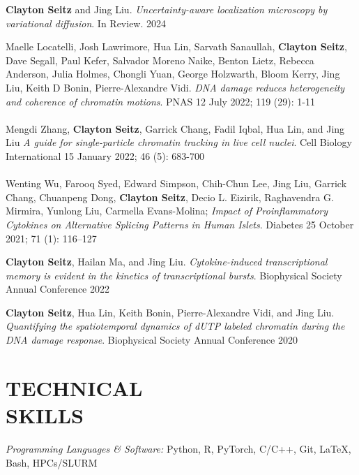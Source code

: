 \documentclass[margin, 10pt]{res} %
\begin{document}
\begin{resume}
\textbf{Clayton Seitz} and Jing Liu. \textit{Uncertainty-aware localization microscopy by variational diffusion}. In Review. 2024

Maelle Locatelli\textsuperscript{\textdagger}, Josh Lawrimore\textsuperscript{\textdagger}, Hua Lin\textsuperscript{\textdagger}, Sarvath Sanaullah, \textbf{Clayton Seitz}, Dave Segall, Paul Kefer, Salvador Moreno Naike, Benton Lietz, Rebecca Anderson, Julia Holmes, Chongli Yuan, George Holzwarth, Bloom Kerry, Jing Liu, Keith D Bonin, Pierre-Alexandre Vidi. \textit{DNA damage reduces heterogeneity and coherence of chromatin motions}. PNAS 12 July 2022; 119 (29): 1-11
\\
\\
Mengdi Zhang, \textbf{Clayton Seitz}, Garrick Chang, Fadil Iqbal, Hua Lin, and Jing Liu \textit{A guide for single-particle chromatin tracking in live cell nuclei}. Cell Biology International 15 January 2022; 46 (5): 683-700
\\
\\
Wenting Wu, Farooq Syed, Edward Simpson, Chih-Chun Lee, Jing Liu, Garrick Chang, Chuanpeng Dong, \textbf{Clayton Seitz}, Decio L. Eizirik, Raghavendra G. Mirmira, Yunlong Liu, Carmella Evans-Molina; \textit{Impact of Proinflammatory Cytokines on Alternative Splicing Patterns in Human Islets}. Diabetes 25 October 2021; 71 (1): 116–127

\textbf{Clayton Seitz}, Hailan Ma, and Jing Liu. \textit{Cytokine-induced transcriptional memory is evident in the kinetics of transcriptional bursts}. Biophysical Society Annual Conference 2022


\textbf{Clayton Seitz}, Hua Lin, Keith Bonin, Pierre-Alexandre Vidi, and Jing Liu. \textit{Quantifying the spatiotemporal dynamics of dUTP labeled chromatin during the DNA damage response}. Biophysical Society Annual Conference 2020


\section{TECHNICAL \\ SKILLS} 

{\sl Programming Languages \& Software:} 
Python, R, PyTorch, C/C++, Git, LaTeX, Bash, HPCs/SLURM\\

\end{resume}
\end{document}
